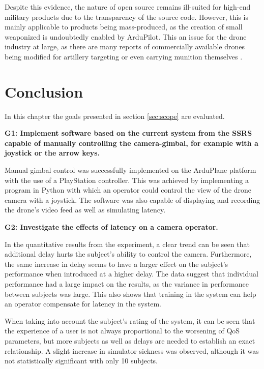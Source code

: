 \documentclass[nofilelist]{cslthse-msc}
\begin{document}
Despite this evidence, the nature of open source remains ill-suited for high-end military products due to the transparency of the source code. However, this is mainly applicable to products being mass-produced, as the creation of small weaponized is undoubtedly enabled by ArduPilot. This an issue for the drone industry at large, as there are many reports of commercially available drones being modified for artillery targeting or even carrying munition themselves \cite{drones-ukraine}. 

\chapter{Conclusion}
In this chapter the goals presented in section \ref{sec:scope} are evaluated.

\begin{description}

   \item \textbf{G1: Implement software based on the current system from the SSRS capable of manually controlling the camera-gimbal, for example with a joystick or the arrow keys.} 

   \item
   Manual gimbal control was successfully implemented on the ArduPlane platform with the use of a PlayStation controller. This was achieved by implementing a program in Python with which an operator could control the view of the drone camera with a joystick. The software was also capable of displaying and recording the drone's video feed as well as simulating latency.

   \item \textbf{G2: Investigate the effects of latency on a camera operator.} 

   \item
   In the quantitative results from the experiment, a clear trend can be seen that additional delay hurts the subject's ability to control the camera. Furthermore, the same increase in delay seems to have a larger effect on the subject's performance when introduced at a higher delay. The data suggest that individual performance had a large impact on the results, as the variance in performance between subjects was large. This also shows that training in the system can help an operator compensate for latency in the system.
   
   When taking into account the subject's rating of the system, it can be seen that the experience of a user is not always proportional to the worsening of QoS parameters, but more subjects as well as delays are needed to establish an exact relationship. A slight increase in simulator sickness was observed, although it was not statistically significant with only 10 subjects.


\end{description}
\end{document}
